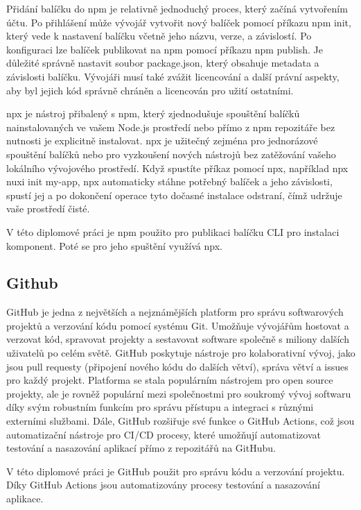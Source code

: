 Přidání balíčku do npm je relativně jednoduchý proces, který začíná vytvořením účtu. Po přihlášení může vývojář vytvořit nový balíček pomocí příkazu npm init, který vede k nastavení balíčku včetně jeho názvu, verze, a závislostí. Po konfiguraci lze balíček publikovat na npm pomocí příkazu npm publish. Je důležité správně nastavit soubor package.json, který obsahuje metadata a závislosti balíčku. Vývojáři musí také zvážit licencování a další právní aspekty, aby byl jejich kód správně chráněn a licencován pro užití ostatními.

npx je nástroj přibalený s npm, který zjednodušuje spouštění balíčků nainstalovaných ve vašem Node.js prostředí nebo přímo z npm repozitáře bez nutnosti je explicitně instalovat. npx je užitečný zejména pro jednorázové spouštění balíčků nebo pro vyzkoušení nových nástrojů bez zatěžování vašeho lokálního vývojového prostředí. Když spustíte příkaz pomocí npx, například npx nuxi init my-app, npx automaticky stáhne potřebný balíček a jeho závislosti, spustí jej a po dokončení operace tyto dočasné instalace odstraní, čímž udržuje vaše prostředí čisté.

V této diplomové práci je npm použito pro publikaci balíčku CLI pro instalaci komponent. Poté se pro jeho spuštění využívá npx.

\subsection{Github}
GitHub je jedna z největších a nejznámějších platform pro správu softwarových projektů a verzování kódu pomocí systému Git. Umožňuje vývojářům hostovat a verzovat kód, spravovat projekty a sestavovat software společně s miliony dalších uživatelů po celém světě. GitHub poskytuje nástroje pro kolaborativní vývoj, jako jsou pull requesty (připojení nového kódu do dalších větví), správa větví a issues pro každý projekt. Platforma se stala populárním nástrojem pro open source projekty, ale je rovněž populární mezi společnostmi pro soukromý vývoj softwaru díky svým robustním funkcím pro správu přístupu a integraci s různými externími službami. Dále, GitHub rozšiřuje své funkce o GitHub Actions, což jsou automatizační nástroje pro CI/CD procesy, které umožňují automatizovat testování a nasazování aplikací přímo z repozitářů na GitHubu. \cite{Github}

V této diplomové práci je GitHub použit pro správu kódu a verzování projektu. Díky GitHub Actions jsou automatizovány procesy testování a nasazování aplikace.

